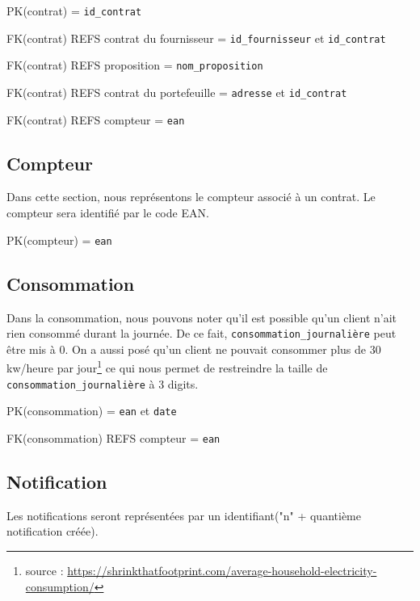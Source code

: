\begin{flushleft}
PK(contrat) = \texttt{id\_contrat}
\end{flushleft}

\begin{flushleft}
FK(contrat) REFS contrat du fournisseur = \texttt{id\_fournisseur} et \texttt{id\_contrat}

FK(contrat) REFS proposition = \texttt{nom\_proposition}

FK(contrat) REFS contrat du portefeuille = \texttt{adresse} et \texttt{id\_contrat}

FK(contrat) REFS compteur = \texttt{ean}
\end{flushleft}
\newpage
\subsection{Compteur}
\begin{flushleft}
Dans cette section, nous représentons le compteur associé à un contrat. Le compteur sera identifié par le code EAN. 
\end{flushleft}

\begin{flushleft}
PK(compteur) = \texttt{ean}
\end{flushleft}
\subsection{Consommation}
\begin{flushleft}
Dans la consommation, nous pouvons noter qu'il est possible qu'un client n'ait rien consommé durant la journée. De ce fait, \texttt{consommation\_journalière} peut être mis à 0. On a aussi posé qu'un
client ne pouvait consommer plus de 30 kw/heure par jour\footnote{source : \url{https://shrinkthatfootprint.com/average-household-electricity-consumption/}} ce qui nous permet de restreindre la taille de \texttt{consommation\_journalière} à 3 digits.
\end{flushleft}

\begin{flushleft}
PK(consommation) = \texttt{ean} et \texttt{date}
\end{flushleft}

\begin{flushleft}
FK(consommation) REFS compteur = \texttt{ean}
\end{flushleft}

\subsection{Notification}
\begin{flushleft}
Les notifications seront représentées par un identifiant("n" + quantième notification créée).
\end{flushleft}

